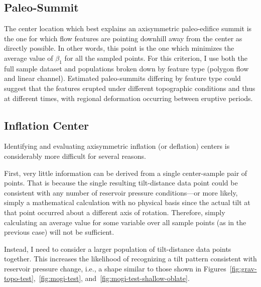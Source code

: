 \subsection{Paleo-Summit}\label{sec:paleo-summit}

The center location which best explains an axisymmetric paleo-edifice summit is the one for which flow features are pointing downhill away from the center as directly possible. In other words, this point is the one which minimizes the average value of $\beta_1$ for all the sampled points. For this criterion, I use both the full sample dataset and populations broken down by feature type (polygon flow and linear channel). Estimated paleo-summits differing by feature type could suggest that the features erupted under different topographic conditions and thus at different times, with regional deformation occurring between eruptive periods.

\subsection{Inflation Center}\label{sec:inflation-center}

Identifying and evaluating axisymmetric inflation (or deflation) centers is considerably more difficult for several reasons.

First, very little information can be derived from a single center-sample pair of points. That is because the single resulting tilt-distance data point could be consistent with any number of reservoir pressure conditions---or more likely, simply a mathematical calculation with no physical basis since the actual tilt at that point occurred about a different axis of rotation. Therefore, simply calculating an average value for some variable over all sample points (as in the previous case) will not be sufficient.

Instead, I need to consider a larger population of tilt-distance data points together. This increases the likelihood of recognizing a tilt pattern consistent with reservoir pressure change, i.e., a shape similar to those shown in Figures~\ref{fig:grav-topo-test},~\ref{fig:mogi-test}, and~\ref{fig:mogi-test-shallow-oblate}. %

